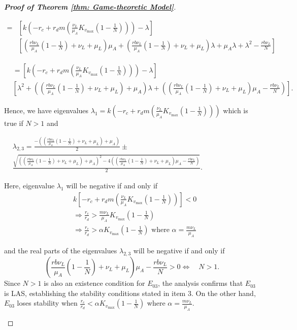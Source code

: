 \documentclass[10pt,a4paper]{amsart}
\begin{document}
\begin{proof}[\textbf{Proof of Theorem \ref{thm: Game-theoretic Model}}]
\begin{itemize}
$$
\begin{aligned}
= & {\left[k\left(-r_c+r_d m\left(\frac{\nu_L}{\mu_A} K_{v_{\max }}\left(1-\frac{1}{{N}}\right)\right)\right)-\lambda\right] } \\
& {\left[\left(\frac{r b \nu_L}{\mu_A}\left(1-\frac{1}{{N}}\right)+\nu_L+\mu_L\right) \mu_A+\left(\frac{r b \nu_L}{\mu_A}\left(1-\frac{1}{{N}}\right)+\nu_L+\mu_L\right) \lambda+\mu_A \lambda+\lambda^2-\frac{r b \nu_L}{{N}}\right] }
\end{aligned}
$$

$$
\begin{aligned} 
& =\left[k\left(-r_c+r_d  m\left(\frac{\nu_L}{\mu_A} K_{v_{\max }}\left(1-\frac{1}{{N}}\right)\right)\right)-\lambda\right]  \\
& {\left[\lambda^2+\left(\left(\frac{r b \nu_L}{\mu_A}\left(1-\frac{1}{{N}}\right)+\nu_L+\mu_L\right)+\mu_A\right) \lambda+\left(\left(\frac{r b \nu_L}{\mu_A}\left(1-\frac{1}{{N}}\right)+\nu_L+\mu_L\right) \mu_A-\frac{r b \nu_L}{{N}}\right)\right]}.
\end{aligned}
$$

Hence, we have eigenvalues $\lambda_1=k\left(-r_c+r_d m\left(\frac{\nu_L}{\mu_A} K_{v_{\max }}\left(1-\frac{1}{{N}}\right)\right)\right)
$ which is true if $N>1$  and

$
\begin{aligned}
& \lambda_{2,3}=\frac{-\left(\left(\frac{r b \nu_L}{\mu_A}\left(1-\frac{1}{{N}}\right)+\nu_L+\mu_L\right)+\mu_A\right)}{2} \pm \\
& \frac{\sqrt{\left(\left(\frac{r b \nu_L}{\mu_A}\left(1-\frac{1}{{N}}\right)+\nu_L+\mu_L\right)+\mu_A\right)^2-4\left(\left(\frac{r b \nu_L}{\mu_A}\left(1-\frac{1}{{N}}\right)+\nu_L+\mu_L\right) \mu_A-\frac{r b \nu_L}{{N}}\right)}}{2}.
\end{aligned}
$

Here, eigenvalue \(\lambda_1\) will be negative if and only if $$
\begin{aligned}
& k\left[-r_c+r_d m\left(\frac{\nu_L}{\mu_A} K_{v_{\max }}\left(1-\frac{1}{{N}}\right)\right)\right]<0 \\
& \Rightarrow \frac{r_c}{r_d}>\frac{m \nu_L}{\mu_A} K_{v_{\max }}\left(1-\frac{1}{{N}}\right) \\
& \Rightarrow \frac{r_c}{r_d}>\alpha K_{v_{\max }}\left(1-\frac{1}{{N}}\right) \text { where } \alpha=\frac{m \nu_L}{\mu_A}
\end{aligned}
$$

and the real parts of the eigenvalues \(\lambda_{2, 3}\) will be negative if and only if
$$
\left(\frac{r b \nu_L}{\mu_A}\left(1-\frac{1}{{N}}\right)+\nu_L+\mu_L\right) \mu_A-\frac{r b \nu_L}{{N}}>0 
 \Leftrightarrow \quad {N}>1.
$$ 
 Since $N>1$ is also an existence condition for $E_{03}$, the analysis confirms that $E_{03}$ is LAS, establishing the stability conditions stated in item 3. On the other hand, $E_{03}$ loses stability when $\frac{r_c}{r_d}<\alpha K_{v_{\max }}\left(1-\frac{1}{N}\right)$ where $\alpha=\frac{m \nu_L}{\mu_A}$.



\end{itemize}
\end{proof}
\end{document}
